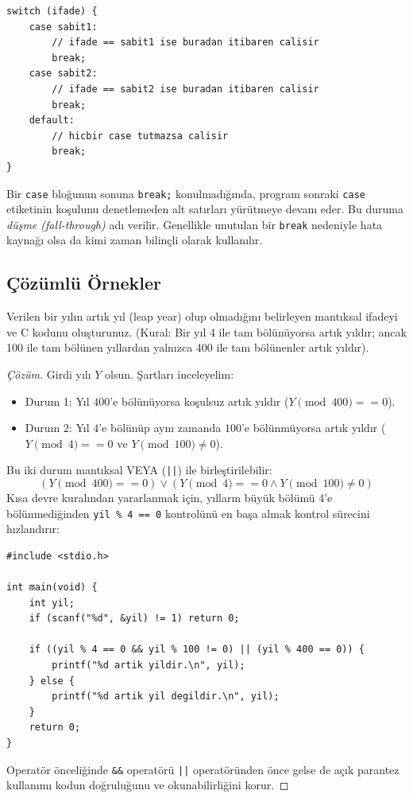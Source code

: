 \begin{lstlisting}[language=CTemel]
switch (ifade) {
    case sabit1:
        // ifade == sabit1 ise buradan itibaren calisir
        break;
    case sabit2:
        // ifade == sabit2 ise buradan itibaren calisir
        break;
    default:
        // hicbir case tutmazsa calisir
        break;
}
\end{lstlisting}

\begin{definition}
Bir \texttt{case} bloğunun sonuna \texttt{break;} konulmadığında, program sonraki \texttt{case} etiketinin koşulunu denetlemeden alt satırları yürütmeye devam eder. Bu duruma \textit{düşme (fall-through)} adı verilir. Genellikle unutulan bir \texttt{break} nedeniyle hata kaynağı olsa da kimi zaman bilinçli olarak kullanılır.
\end{definition}

\subsection{Çözümlü Örnekler}

\begin{example}
Verilen bir yılın artık yıl (leap year) olup olmadığını belirleyen mantıksal ifadeyi ve C kodunu oluşturunuz. (Kural: Bir yıl 4 ile tam bölünüyorsa artık yıldır; ancak 100 ile tam bölünen yıllardan yalnızca 400 ile tam bölünenler artık yıldır).
\end{example}

\begin{proof}[Çözüm]
Girdi yılı $Y$ olsun. Şartları inceleyelim:
\begin{itemize}
    \item Durum 1: Yıl $400$'e bölünüyorsa koşulsuz artık yıldır ($Y \pmod{400} == 0$).
    \item Durum 2: Yıl $4$'e bölünüp aynı zamanda $100$'e bölünmüyorsa artık yıldır ($Y \pmod 4 == 0 \text{ ve } Y \pmod{100} \ne 0$).
\end{itemize}
Bu iki durum mantıksal VEYA (\texttt{||}) ile birleştirilebilir:
\[
(Y \pmod{400} == 0) \lor (Y \pmod 4 == 0 \land Y \pmod{100} \ne 0)
\]
Kısa devre kuralından yararlanmak için, yılların büyük bölümü 4'e bölünmediğinden \texttt{yil \% 4 == 0} kontrolünü en başa almak kontrol sürecini hızlandırır:

\begin{lstlisting}[language=CTemel]
#include <stdio.h>

int main(void) {
    int yil;
    if (scanf("%d", &yil) != 1) return 0;

    if ((yil % 4 == 0 && yil % 100 != 0) || (yil % 400 == 0)) {
        printf("%d artik yildir.\n", yil);
    } else {
        printf("%d artik yil degildir.\n", yil);
    }
    return 0;
}
\end{lstlisting}
Operatör önceliğinde \texttt{\&\&} operatörü \texttt{||} operatöründen önce gelse de açık parantez kullanımı kodun doğruluğunu ve okunabilirliğini korur.
\end{proof}

